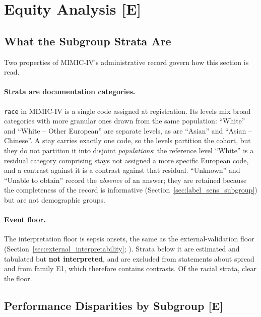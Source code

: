 

\section{Equity Analysis \texorpdfstring{[E]}{[E]}}
\label{sec:equity}

\subsection{What the Subgroup Strata Are}
\label{sec:equity_strata}

Two properties of MIMIC-IV's administrative record govern how this section is
read.

\paragraph{Strata are documentation categories.}
\texttt{race} in MIMIC-IV is a single code assigned at registration. Its levels
mix broad categories with more granular ones drawn from the same population:
``White'' and ``White -- Other European'' are separate levels, as are ``Asian''
and ``Asian -- Chinese''. A stay carries exactly one code, so the levels
partition the cohort, but they do not partition it into disjoint
\emph{populations}: the reference level ``White'' is a residual category
comprising stays not assigned a more specific European code, and a contrast
against it is a contrast against that residual. ``Unknown'' and ``Unable to
obtain'' record the \emph{absence} of an answer; they are retained because the
completeness of the record is informative (Section~\ref{sec:label_sens_subgroup})
but are not demographic groups.

\paragraph{Event floor.}
The interpretation floor is \pcMinSubgroupEvents{} sepsis onsets, the same as
the external-validation floor (Section~\ref{sec:external_interpretability};
\cite{riley2019sample, collins2024tripodai}). Strata below it are estimated and
tabulated but \textbf{not interpreted}, and are excluded from statements about
spread and from family E1, which therefore contains \pcEquityNContrastsEOne{}
contrasts. Of the racial strata, \pcNSubgroupsAboveFloor{} clear the floor.

\subsection{Performance Disparities by Subgroup \texorpdfstring{[E]}{[E]}}

